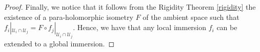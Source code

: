 \documentclass{article}
\newcommand{\de}{\partial}
\begin{document}
\begin{proof}
Finally, we notice that it follows from the Rigidity Theorem \ref{rigidity} the existence of a para-holomorphic isometry  $F$ of the ambient space such that  $f_i|_{\mathcal{U}_i\cap\mathcal{U}_j }= F\circ f_j|_{\mathcal{U}_i\cap\mathcal{U}_j }$. Hence, we have that any local immersion $f_i$ can be extended to a global immersion.
\end{proof}







%
%
\end{document}
